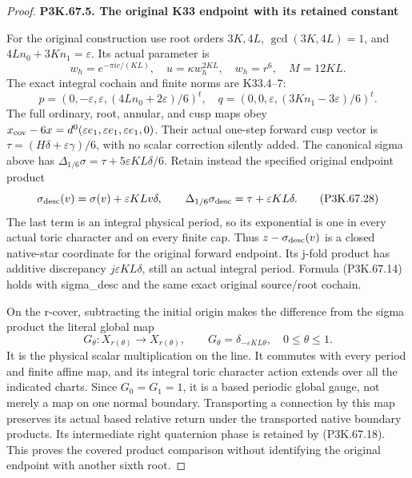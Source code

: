 \begin{proof}
\par

\medskip\noindent\textbf{P3K.67.5. The original K33 endpoint with its retained constant}

\par\nobreak

For the original construction use root orders \(3K,4L\),
\(\gcd(3K,4L)=1\), and \(4Ln_0+3Kn_1=\varepsilon\).
Its actual parameter is
\[
 w_h=e^{-\pi ic/(KL)},\quad u=\kappa w_h^{2KL},\quad
 w_h=r^6,\quad M=12KL.
 \tag{P3K.67.27}
\]
The exact integral cochain and finite norms are K33.4--7:
\[
 p=(0,-\varepsilon,\varepsilon,(4Ln_0+2\varepsilon)/6)^t,
 \quad q=(0,0,\varepsilon,(3Kn_1-3\varepsilon)/6)^t.
\]
The full ordinary, root, annular, and cusp maps obey
\(x_{\rm cov}-6x=d^0(\varepsilon e_1,\varepsilon e_1,
\varepsilon e_1,0)\). Their actual one-step forward cusp vector is
\(\tau=(H\delta+\varepsilon\gamma)/6\), with no scalar correction
silently added. The canonical sigma above has
\(\Delta_{1/6}\sigma=\tau+5\varepsilon KL\delta/6\).
Retain instead the specified original endpoint product
\[
 \sigma_{\rm desc}(v)=\sigma(v)+\varepsilon KLv\delta,
 \qquad \Delta_{1/6}\sigma_{\rm desc}
                    =\tau+\varepsilon KL\delta.
 \tag{P3K.67.28}
\]
The last term is an integral physical period, so its exponential is
one in every actual toric character and on every finite cap. Thus
\(z-\sigma_{\rm desc}(v)\) is a closed native-star coordinate for
the original forward endpoint. Its j-fold product has additive
discrepancy \(j\varepsilon KL\delta\), still an actual integral
period. Formula (P3K.67.14) holds with sigma\_desc and the same exact
original source/root cochain.

On the r-cover, subtracting the initial origin makes the difference
from the sigma product the literal global map
\[
 G_\theta:X_{r(\theta)}\longrightarrow X_{r(\theta)},
 \qquad G_\theta=\delta_{-\varepsilon KL\theta},
                         \quad0\le\theta\le1.
 \tag{P3K.67.29}
\]
It is the physical scalar multiplication on the line. It commutes
with every period and finite affine map, and its integral toric
character action extends over all the indicated charts. Since
\(G_0=G_1=1\), it is a based periodic global gauge, not merely a
map on one normal boundary. Transporting a connection by this map
preserves its actual based relative return under the transported
native boundary products. Its intermediate right quaternion phase
is retained by (P3K.67.18). This proves the covered product comparison
without identifying the original endpoint with another sixth root.


\end{proof}
